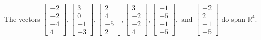 \begin{exercise}
\begin{exerciseStatement}
  \end{exerciseStatement}
  \begin{exerciseAnswer}
   The vectors \(\left[\begin{array}{r}
-2 \\
-2 \\
-4 \\
4
\end{array}\right] , \left[\begin{array}{r}
3 \\
0 \\
-1 \\
-3
\end{array}\right] , \left[\begin{array}{r}
2 \\
4 \\
-5 \\
2
\end{array}\right] , \left[\begin{array}{r}
3 \\
-2 \\
-2 \\
4
\end{array}\right] , \left[\begin{array}{r}
-1 \\
-5 \\
-1 \\
-5
\end{array}\right] , \text{ and } \left[\begin{array}{r}
-2 \\
2 \\
-1 \\
-5
\end{array}\right]\) 
  	 do  
	span \(\mathbb{R}^4\).
  


  \end{exerciseAnswer}
\end{exercise}